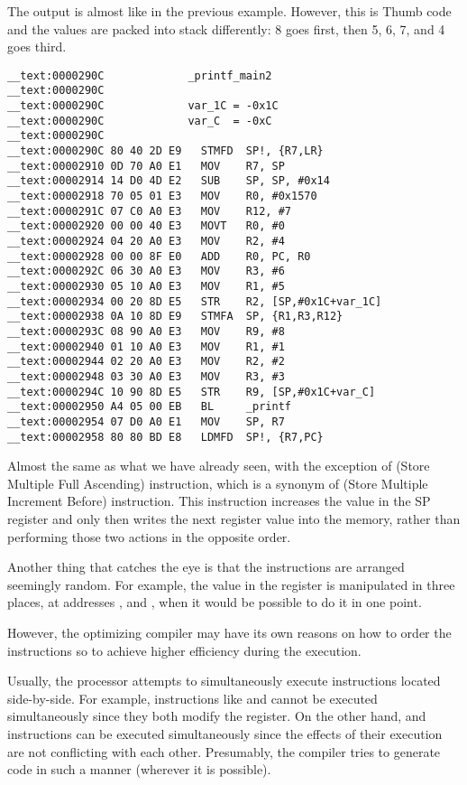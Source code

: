 The output is almost like in the previous example. However, this is Thumb code and the values are packed into stack differently: 
8 goes first, then 5, 6, 7, and 4 goes third.

\myparagraph{\OptimizingXcodeIV: \ARMMode}

\begin{lstlisting}
__text:0000290C             _printf_main2
__text:0000290C
__text:0000290C             var_1C = -0x1C
__text:0000290C             var_C  = -0xC
__text:0000290C
__text:0000290C 80 40 2D E9   STMFD  SP!, {R7,LR}
__text:00002910 0D 70 A0 E1   MOV    R7, SP
__text:00002914 14 D0 4D E2   SUB    SP, SP, #0x14
__text:00002918 70 05 01 E3   MOV    R0, #0x1570
__text:0000291C 07 C0 A0 E3   MOV    R12, #7
__text:00002920 00 00 40 E3   MOVT   R0, #0
__text:00002924 04 20 A0 E3   MOV    R2, #4
__text:00002928 00 00 8F E0   ADD    R0, PC, R0
__text:0000292C 06 30 A0 E3   MOV    R3, #6
__text:00002930 05 10 A0 E3   MOV    R1, #5
__text:00002934 00 20 8D E5   STR    R2, [SP,#0x1C+var_1C]
__text:00002938 0A 10 8D E9   STMFA  SP, {R1,R3,R12}
__text:0000293C 08 90 A0 E3   MOV    R9, #8
__text:00002940 01 10 A0 E3   MOV    R1, #1
__text:00002944 02 20 A0 E3   MOV    R2, #2
__text:00002948 03 30 A0 E3   MOV    R3, #3
__text:0000294C 10 90 8D E5   STR    R9, [SP,#0x1C+var_C]
__text:00002950 A4 05 00 EB   BL     _printf
__text:00002954 07 D0 A0 E1   MOV    SP, R7
__text:00002958 80 80 BD E8   LDMFD  SP!, {R7,PC}
\end{lstlisting}

Almost the same as what we have already seen, with the
exception of  (Store Multiple Full Ascending) instruction, which is a synonym of  (Store Multiple Increment Before) instruction. 
This instruction increases the value in the \ac{SP} register and only then writes the next register value into the memory, rather than performing those two actions in the opposite order.

Another thing that catches the eye is that the instructions are arranged seemingly random.
For example, the value in the  register is manipulated in three
places, at addresses ,  and , when it would be possible to do it in one point.

However, the optimizing compiler may have its own reasons on how to order the instructions so to achieve higher efficiency during the execution.

Usually, the processor attempts to simultaneously execute instructions located side-by-side.
For example, instructions like  and
 cannot be executed simultaneously since they both modify the  register. 
On the other hand,  and  
instructions can be executed
simultaneously since the effects of their execution are not conflicting with each other.
Presumably, the compiler tries to generate code in such a manner (wherever it is possible).
 
